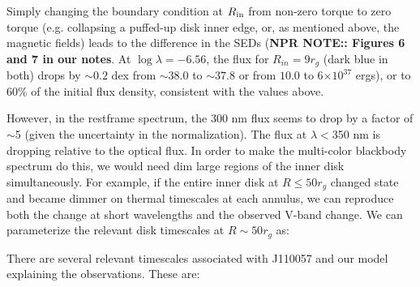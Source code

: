 \documentclass[11pt,a4paper]{article}
\begin{document}
Simply changing the boundary condition at $R_{\rm in}$ from non-zero
torque to zero torque (e.g. collapsing a puffed-up disk inner edge,
or, as mentioned above, the magnetic fields) leads to the difference
in the SEDs ({\bf NPR NOTE:: Figures 6 and 7 in our notes}.  At $\log
\lambda = −6.56$, the flux for $R_{in} = 9 r_{g}$ (dark blue in both)
drops by $\sim0.2$ dex from $\sim38.0$ to $\sim37.8 $ or from $10.0$
to 6$\times 10^{37}$ ergs), or to 60\% of the initial flux density,
consistent with the values above.

However, in the restframe spectrum, the 300 nm flux seems to drop by a
factor of $\sim$5 (given the uncertainty in the normalization). The
flux at $\lambda < $350 nm is dropping relative to the optical
flux. In order to make the multi-color blackbody spectrum do this, we
would need dim large regions of the inner disk simultaneously.  For
example, if the entire inner disk at $R \leq 50 r_{g}$ changed state
and became dimmer on thermal timescales at each annulus, we can
reproduce both the change at short wavelengths and the observed V-band
change.
We can parameterize the relevant disk timescales at $R\sim 50 r_{g}$ as:


There are several relevant timescales associated with J110057 and our 
model explaining the observations. These are: 
\end{document}
